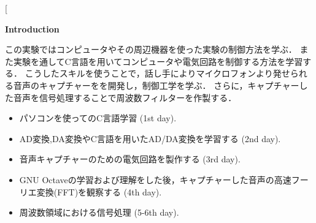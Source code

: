 \documentclass[11pt, a4paper,twocolumn]{jarticle}
\begin{document}
\twocolumn
[
\begin{center}
    \textbf{\Large Introduction}\\
    \begin{flushleft}
        この実験ではコンピュータやその周辺機器を使った実験の制御方法を学ぶ．
        また実験を通してC言語を用いてコンピュータや電気回路を制御する方法を学習する．
        こうしたスキルを使うことで，話し手によりマイクロフォンより発せられる音声のキャプチャーをを開発し，制御工学を学ぶ．
        さらに，キャプチャーした音声を信号処理することで周波数フィルターを作製する．
    \end{flushleft}
    \begin{itemize}
        \item パソコンを使ってのC言語学習 (1st day).
        \item AD変換,DA変換やC言語を用いたAD/DA変換を学習する (2nd day).
        \item 音声キャプチャーのための電気回路を製作する (3rd day).
        \item GNU Octaveの学習および理解をした後，キャプチャーした音声の高速フーリエ変換(FFT)を観察する (4th day).
        \item 周波数領域における信号処理 (5-6th day).
    \end{itemize}
\end{center}
\end{document}
